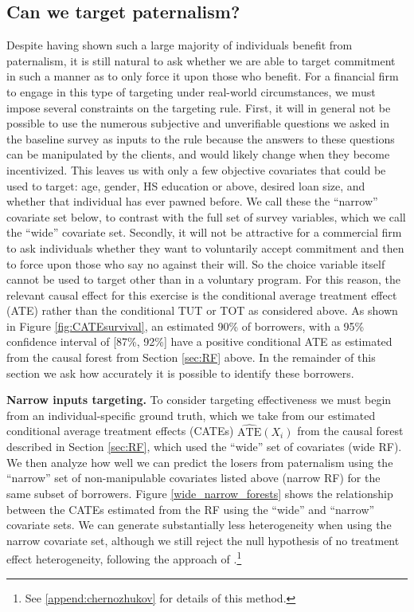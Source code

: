 \documentclass[ecta,nameyear,final]{econsocart}
\begin{document}
\subsection{Can we target paternalism?}

Despite having shown such a large majority of individuals benefit from paternalism, it is still natural to ask whether we are able to target commitment in such a manner as to only force it upon those who benefit. For a financial firm to engage in this type of targeting under real-world circumstances, we must impose several constraints on the targeting rule.  First, it will in general not be possible to use the numerous subjective and unverifiable questions we asked in the baseline survey as inputs to the rule because the answers to these questions can be manipulated by the clients, and would likely change when they become incentivized. This leaves us with only a few objective covariates that could be used to target: age, gender, HS education or above, desired loan size, and whether that individual has ever pawned before. 
We call these the ``narrow'' covariate set below, to contrast with the full set of survey variables, which we call the ``wide'' covariate set.
Secondly, it will not be attractive for a commercial firm to ask individuals whether they want to voluntarily accept commitment and then to force upon those who say no against their will. So the choice variable itself cannot be used to target other than in a voluntary program. 
For this reason, the relevant causal effect for this exercise is the conditional average treatment effect (ATE) rather than the conditional TUT or TOT as considered above.
As shown in Figure \ref{fig:CATEsurvival}, an estimated 90\% of borrowers, with a 95\% confidence interval of [87\%, 92\%] have a positive conditional ATE as estimated from the causal forest from Section \ref{sec:RF} above.
In the remainder of this section we ask how accurately it is possible to identify these borrowers. 

\noindent \textbf{Narrow inputs targeting.} To consider targeting effectiveness we must begin from an individual-specific ground truth, which we take from our estimated conditional average treatment effects (CATEs) $\widehat{\text{ATE}}(X_i)$ from the causal forest described in Section \ref{sec:RF},  which used the ``wide'' set of covariates (wide RF).%
We then analyze how well we can predict the losers from paternalism using the ``narrow'' set of non-manipulable covariates listed above (narrow RF) for the same subset of borrowers.
Figure \ref{wide_narrow_forests} shows the relationship between the CATEs estimated from the RF using the ``wide'' and ``narrow'' covariate sets.  We can generate substantially less heterogeneity when using the narrow covariate set, although we still reject the null hypothesis of no treatment effect heterogeneity, following the approach of \cite{chernozhukov2018generic}.\footnote{See \ref{append:chernozhukov} for details of this method.}
\end{document}
